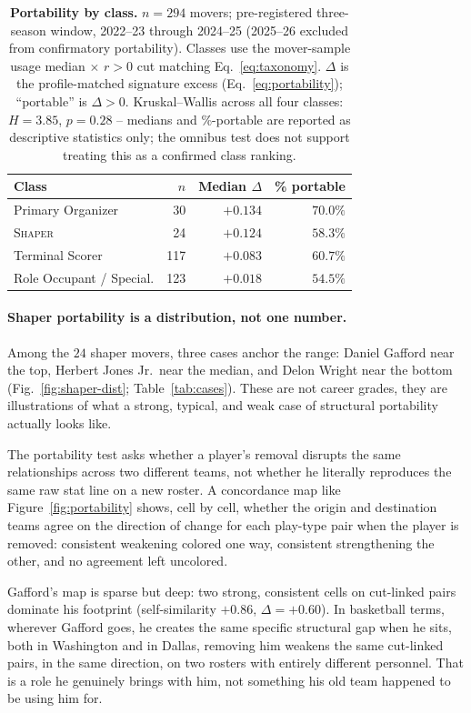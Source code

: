 \documentclass[11pt]{article}
\newcommand{\resid}{\ensuremath{r}} %
\begin{document}
\begin{table}[t]
\centering\small
\caption{\textbf{Portability by class.} $n=294$ movers; pre-registered three-season window,
2022--23 through 2024--25 (2025--26 excluded from confirmatory portability). Classes use the
mover-sample usage median $\times$ $\resid>0$ cut matching Eq.~\ref{eq:taxonomy}. $\Delta$ is
the profile-matched signature excess (Eq.~\ref{eq:portability}); ``portable'' is $\Delta>0$.
Kruskal--Wallis across all four classes: $H=3.85$, $p=0.28$ -- medians and \%-portable are
reported as descriptive statistics only; the omnibus test does not support treating this as a
confirmed class ranking.}
\label{tab:portability-by-class}
\begin{tabular}{lrrr}
\toprule
Class & $n$ & Median $\Delta$ & \% portable \\
\midrule
Primary Organizer & 30 & $+0.134$ & $70.0\%$ \\
\textsc{Shaper} & 24 & $+0.124$ & $58.3\%$ \\
Terminal Scorer & 117 & $+0.083$ & $60.7\%$ \\
Role Occupant / Special. & 123 & $+0.018$ & $54.5\%$ \\
\bottomrule
\end{tabular}
\end{table}

\paragraph{Shaper portability is a distribution, not one number.}
\label{para:conn-dist}
Among the $24$ shaper movers, three cases anchor the range: Daniel Gafford near the top,
Herbert Jones Jr.\ near the median, and Delon Wright near the bottom
(Fig.~\ref{fig:shaper-dist}; Table~\ref{tab:cases}). These are not career grades, they are
illustrations of what a strong, typical, and weak case of structural portability actually
looks like.

The portability test asks whether a player's removal disrupts the same relationships
across two different teams, not whether he literally reproduces the same raw stat line on a
new roster. A concordance map like Figure~\ref{fig:portability} shows, cell by cell,
whether the origin and destination teams agree on the direction of change for each
play-type pair when the player is removed: consistent weakening colored one way,
consistent strengthening the other, and no agreement left uncolored.

Gafford's map is sparse but deep: two strong, consistent cells on cut-linked pairs dominate
his footprint (self-similarity $+0.86$, $\Delta=+0.60$). In basketball terms, wherever
Gafford goes, he creates the same specific structural gap when he sits, both in Washington
and in Dallas, removing him weakens the same cut-linked pairs, in the same direction, on
two rosters with entirely different personnel. That is a role he genuinely brings with him,
not something his old team happened to be using him for.
\end{document}
